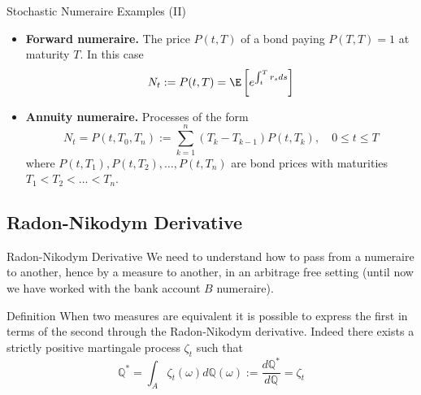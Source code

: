 \documentclass{beamer}
\begin{document}
	\begin{frame}{Stochastic Numeraire Examples (II)}
		\begin{itemize}
			\item<1-> \textbf{Forward numeraire.} The price $P(t,T)$ of a bond paying $P(T,T)=1$ at maturity $T$. In this case
			\begin{equation*}
				N_t := P(t,T)=\E\left[e^{\int_t^T r_s ds}\right]
			\end{equation*}
			\item<2-> \textbf{Annuity numeraire.} Processes of the form
			\begin{equation*}
				N_t = P(t, T_0, T_n) := \sum_{k=1}^{n}(T_k - T_{k-1})P(t, T_k), \quad 0 \le t \le T
			\end{equation*}
			where $P(t,T_1),P(t,T_2),\ldots,P(t,T_n)$ are bond prices with maturities $T_1 < T_2 < \ldots < T_n$.
		\end{itemize}
	\end{frame}

	\subsection{Radon-Nikodym Derivative}
	\begin{frame}{Radon-Nikodym Derivative}
		We need to understand how to pass from a numeraire to another, hence by a measure to another, in an arbitrage free setting (until now we have worked with the bank account $B$ numeraire).
		\begin{block}{Definition}
			When two measures are equivalent it is possible to express the first in terms of the second through the \textcolor{maincolor}{Radon-Nikodym derivative}. Indeed there exists a strictly positive \textcolor{maincolor}{martingale process $\zeta_t$} such that
			\begin{equation*}
				\mathbb{Q}^* =\int_{A} \zeta_t(\omega)d\mathbb{Q}(\omega) := \frac{d\mathbb{Q}^*}{d\mathbb{Q}} = \zeta_t
				\label{eq:radon_nikodym_der}
			\end{equation*}
		\end{block}
	\end{frame}
\end{document}

